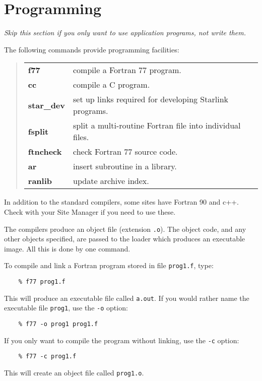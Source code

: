 \documentclass[twoside,11pt]{article}
\begin{document}
\newpage

\section{Programming}

{\em Skip this section if you only want to use application programs, not write
them.}

The following commands provide programming facilities:
\begin{quote}
\begin{tabular}{lp{67mm}}

{\bf f77}       & compile a Fortran 77 program.\\
{\bf cc}        & compile a C program.\\
{\bf star\_dev} & set up links required for developing Starlink programs.\\
{\bf fsplit}    & split a multi-routine Fortran file into individual files.\\
{\bf ftncheck}  & check Fortran 77 source code.\\
{\bf ar}        & insert subroutine in a library.\\
{\bf ranlib}    & update archive index.

\end{tabular}
\end{quote}
In addition to the standard compilers, some sites have Fortran 90 and c++.
Check with your Site Manager if you need to use these.

The compilers produce an object file (extension {\tt .o}).
The object code, and any other objects specified, are passed to the loader
which produces an executable image.
All this is done by one command.

To compile and link a Fortran program stored in file {\tt prog1.f}, type:
\begin{verbatim}
    % f77 prog1.f
\end{verbatim}
This will produce an executable file called {\tt a.out}.
If you would rather name the executable file {\tt prog1}, use the {\tt -o}
option:
\begin{verbatim}
    % f77 -o prog1 prog1.f
\end{verbatim}
If you only want to compile the program without linking, use the {\tt -c}
option:
\begin{verbatim}
    % f77 -c prog1.f
\end{verbatim}
This will create an object file called {\tt prog1.o}.
\end{document}
